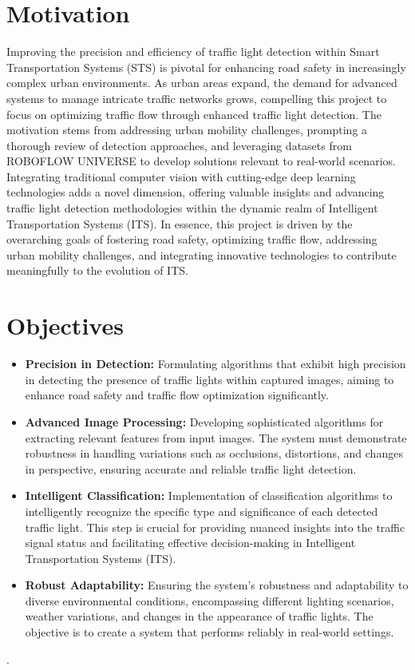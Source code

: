 \documentclass[12 pt]{report}
\begin{document}
\section{Motivation}
\justify
Improving the precision and efficiency of traffic light detection within Smart Transportation Systems (STS) is pivotal for enhancing road safety in increasingly complex urban environments. As urban areas expand, the demand for advanced systems to manage intricate traffic networks grows, compelling this project to focus on optimizing traffic flow through enhanced traffic light detection. The motivation stems from addressing urban mobility challenges, prompting a thorough review of detection approaches, and leveraging datasets from ROBOFLOW UNIVERSE to develop solutions relevant to real-world scenarios. Integrating traditional computer vision with cutting-edge deep learning technologies adds a novel dimension, offering valuable insights and advancing traffic light detection methodologies within the dynamic realm of Intelligent Transportation Systems (ITS). In essence, this project is driven by the overarching goals of fostering road safety, optimizing traffic flow, addressing urban mobility challenges, and integrating innovative technologies to contribute meaningfully to the evolution of ITS.
\flushleft
\section{Objectives}
\begin{justify}
\begin{itemize}
  \item \textbf{Precision in Detection:} Formulating algorithms that exhibit high precision in detecting the presence of traffic lights within captured images, aiming to enhance road safety and traffic flow optimization significantly.

  \item \textbf{Advanced Image Processing:} Developing sophisticated algorithms for extracting relevant features from input images. The system must demonstrate robustness in handling variations such as occlusions, distortions, and changes in perspective, ensuring accurate and reliable traffic light detection.

  \item \textbf{Intelligent Classification:} Implementation of classification algorithms to intelligently recognize the specific type and significance of each detected traffic light. This step is crucial for providing nuanced insights into the traffic signal status and facilitating effective decision-making in Intelligent Transportation Systems (ITS).

  \item \textbf{Robust Adaptability:} Ensuring the system's robustness and adaptability to diverse environmental conditions, encompassing different lighting scenarios, weather variations, and changes in the appearance of traffic lights. The objective is to create a system that performs reliably in real-world settings.
\end{itemize}.
\end{justify}
\end{document}
